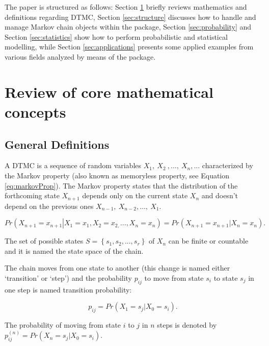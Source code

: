\documentclass[
  nojss]{jss}
\begin{document}
The paper is structured as follows: Section \ref{sec:mathematics} briefly reviews mathematics and definitions regarding DTMC, Section \ref{sec:structure} discusses how to handle and manage Markov chain objects within the package, Section \ref{sec:probability} and Section \ref{sec:statistics} show how to perform probabilistic and statistical modelling, while Section \ref{sec:applications} presents some applied examples from various fields analyzed by means of the  package.

\hypertarget{sec:mathematics}{%
\section{Review of core mathematical concepts}\label{sec:mathematics}}

\hypertarget{general-definitions}{%
\subsection{General Definitions}\label{general-definitions}}

A DTMC is a sequence of random variables \(X_{1},\: X_{2}\: ,\ldots,\:X_{n},\ldots\) characterized by the Markov property (also known as memoryless property, see Equation \ref{eq:markovProp}). The Markov property states that the distribution of the forthcoming state \(X_{n+1}\) depends only on the current state \(X_{n}\) and doesn't depend on the previous ones \(X_{n-1},\: X_{n-2},\ldots,\: X_{1}\).

\begin{equation}
Pr\left(X_{n+1}=x_{n+1}\left|X_{1}=x_{1},X_{2}=x_{2,}...,X_{n}=x_{n}\right.\right)=Pr\left(X_{n+1}=x_{n+1}\left|X_{n}=x_{n}\right.\right).
\label{eq:markovProp}
\end{equation}

The set of possible states \(S=\left\{ s_{1},s_{2},...,s_{r}\right\}\) of \(X_{n}\) can be finite or countable and it is named the state space of the chain.

The chain moves from one state to another (this change is named either `transition' or `step') and the probability \(p_{ij}\) to move from state \(s_{i}\) to state \(s_{j}\) in one step is named transition probability:

\begin{equation}
p_{ij}=Pr\left(X_{1}=s_{j}\left|X_{0}=s_{i}\right.\right).
\label{eq:trProp}
\end{equation}

The probability of moving from state \(i\) to \(j\) in \(n\) steps is denoted by \(p_{ij}^{(n)}=Pr\left(X_{n}=s_{j}\left|X_{0}=s_{i}\right.\right)\).
\end{document}
